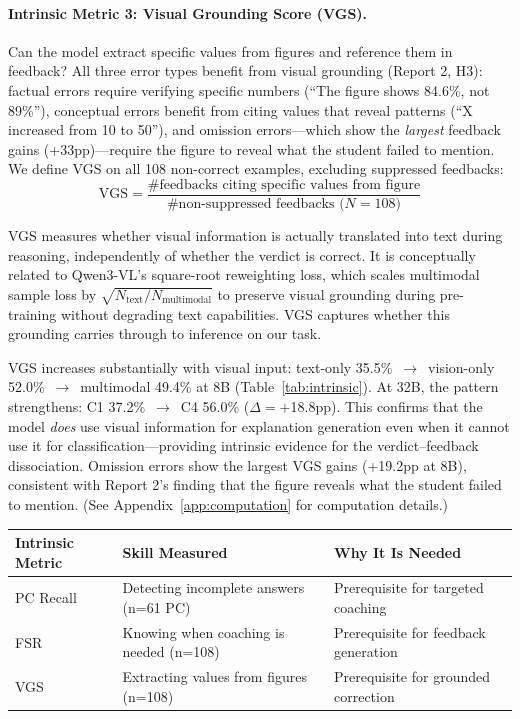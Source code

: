 \documentclass{article}
\begin{document}
\paragraph{Intrinsic Metric 3: Visual Grounding Score (VGS).}

Can the model extract specific values from figures and reference them in feedback?
All three error types benefit from visual grounding (Report 2, H3): factual errors
require verifying specific numbers (``The figure shows 84.6\%, not 89\%''),
conceptual errors benefit from citing values that reveal patterns (``X increased
from 10 to 50''), and omission errors---which show the \textit{largest} feedback
gains (+33pp)---require the figure to reveal what the student failed to mention.
We define VGS on all 108 non-correct examples, excluding suppressed feedbacks:
\begin{equation}
\text{VGS} = \frac{\text{\# feedbacks citing specific values from figure}}{\text{\# non-suppressed feedbacks (}N{=}108\text{)}}
\end{equation}

VGS measures whether visual information is actually translated into text during
reasoning, independently of whether the verdict is correct. It is conceptually
related to Qwen3-VL's square-root reweighting loss, which scales multimodal
sample loss by $\sqrt{N_{\text{text}}/N_{\text{multimodal}}}$ to preserve
visual grounding during pre-training without degrading text capabilities.
VGS captures whether this grounding carries through to inference on our task.

VGS increases substantially with visual input: text-only 35.5\%~$\to$~vision-only
52.0\%~$\to$~multimodal 49.4\% at 8B (Table~\ref{tab:intrinsic}). At 32B, the
pattern strengthens: C1 37.2\%~$\to$~C4 56.0\% ($\Delta{=}+$18.8pp). This confirms
that the model \textit{does} use visual information for explanation generation even
when it cannot use it for classification---providing intrinsic evidence for the
verdict--feedback dissociation. Omission errors show the largest VGS gains
(+19.2pp at 8B), consistent with Report 2's finding that the figure reveals what
the student failed to mention. (See Appendix~\ref{app:computation} for computation details.)

\medskip
\noindent
\begin{center}
\small
\begin{tabular}{lll}
\toprule
Intrinsic Metric & Skill Measured & Why It Is Needed \\
\midrule
PC Recall & Detecting incomplete answers (n=61 PC) & Prerequisite for targeted coaching \\
FSR       & Knowing when coaching is needed (n=108) & Prerequisite for feedback generation \\
VGS       & Extracting values from figures (n=108)  & Prerequisite for grounded correction \\
\bottomrule
\end{tabular}
\end{center}
\end{document}
